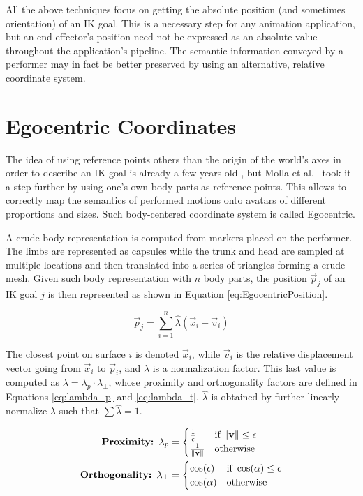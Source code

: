 All the above techniques focus on getting the absolute position (and sometimes orientation) of an IK goal. This is a necessary step for any animation application, but an end effector's position need not be expressed as an absolute value throughout the application's pipeline. The semantic information conveyed by a performer may in fact be better preserved by using an alternative, relative coordinate system.

\section{Egocentric Coordinates}
\label{sec:egocentric}

The idea of using reference points others than the origin of the world's axes in order to describe an IK goal is already a few years old \cite{al2013relationship}, but Molla et al.\ \cite{molla2017egocentric,molla2016precise} took it a step further by using one's own body parts as reference points. This allows to correctly map the semantics of performed motions onto avatars of different proportions and sizes. Such body-centered coordinate system is called Egocentric.

A crude body representation is computed from markers placed on the performer. The limbs are represented as capsules while the trunk and head are sampled at multiple locations and then translated into a series of triangles forming a crude mesh. Given such body representation with $n$ body parts, the position $\vec{p}_j$ of an IK goal $j$ is then represented as shown in Equation \ref{eq:EgocentricPosition}.

\begin{equation}
\label{eq:EgocentricPosition}
\vec{p}_j = \displaystyle\sum_{i=1}^{n} \hat{\lambda}(\vec{x}_i + \vec{v}_i)
\end{equation}

The closest point on surface $i$ is denoted $\vec{x}_i$, while $\vec{v}_i$ is the relative displacement vector going from $\vec{x}_i$ to $\vec{p}_i$, and $\lambda $ is a normalization factor. This last value is computed as $\lambda = \lambda_p \cdot \lambda_\perp$, whose proximity and orthogonality factors are defined in Equations \ref{eq:lambda_p} and \ref{eq:lambda_t}. $\hat{\lambda}$ is obtained by further linearly normalize $\lambda$ such that $\sum \hat{\lambda} = 1$.

\begin{align}
    \label{eq:lambda_p}
    \textbf{Proximity: } \lambda_p &=
    \begin{cases}
        \frac{1}{\epsilon}          &\text{if } \lVert\mathbf{v}\rVert \leq \epsilon\\
        \frac{1}{\lVert\mathbf{v}\rVert}    &\text{otherwise}
    \end{cases}
    \\
    \label{eq:lambda_t}
    \textbf{Orthogonality: } \lambda_\perp &=
    \begin{cases}
        \cos(\epsilon)      &\text{if } \cos(\alpha) \leq \epsilon\\
        \cos(\alpha)        &\text{otherwise}
    \end{cases}
\end{align}

